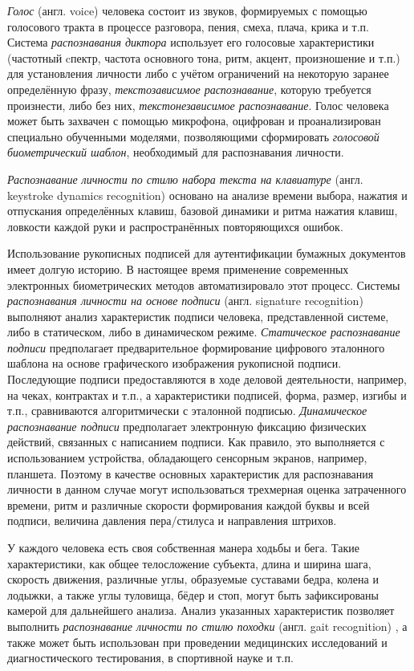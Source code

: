 \documentclass[12pt]{book}
\begin{document}
\large{\textit{Голос} (англ. voice) человека состоит из звуков, формируемых с помощью голосового тракта в процессе разговора, пения, смеха, плача, крика и т.п. Система \textit{распознавания диктора} \cite{unar_2014, minaee_2023, hansen_2015, bai_2021} использует его голосовые характеристики (частотный cпектр, частота основного тона, ритм, акцент, произношение и т.п.) для установления личности либо с учётом ограничений на некоторую заранее определённую фразу, \textit{текстозависимое распознавание}, которую требуется произнести, либо без них, \textit{текстонезависимое распознавание}. Голос человека может быть захвачен с помощью микрофона, оцифрован и проанализирован специально обученными моделями, позволяющими сформировать \textit{голосовой биометрический шаблон}, необходимый для распознавания личности. 

\textit{Распознавание личности по стилю набора текста на клавиатуре} (англ. keystroke dynamics recognition) \cite{unar_2014, sharma_2023} основано на анализе времени выбора, нажатия и отпускания определённых клавиш, базовой динамики и ритма нажатия клавиш, ловкости каждой руки и распространённых повторяющихся ошибок.

Использование рукописных подписей для аутентификации бумажных документов имеет долгую историю. В настоящее время применение современных электронных биометрических методов автоматизировало этот процесс. Системы \textit{распознавания личности на основе подписи} (англ. signature recognition) \cite{unar_2014, minaee_2023} выполняют анализ характеристик подписи человека, представленной системе, либо в статическом, либо в динамическом режиме. \textit{Статическое распознавание подписи} предполагает предварительное формирование цифрового эталонного шаблона на основе графического изображения рукописной подписи. Последующие подписи предоставляются в ходе деловой деятельности, например, на чеках, контрактах и т.п., а характеристики подписей, форма, размер, изгибы и т.п., сравниваются алгоритмически с эталонной подписью. \textit{Динамическое распознавание подписи} предполагает электронную фиксацию физических действий, связанных с написанием подписи. Как правило, это выполняется с использованием устройства, обладающего сенсорным экранов, например, планшета. Поэтому в качестве основных характеристик для распознавания личности в данном случае могут использоваться трехмерная оценка затраченного времени, ритм и различные скорости формирования каждой буквы и всей подписи, величина давления пера/стилуса и направления штрихов.

У каждого человека есть своя собственная манера ходьбы и бега. Такие характеристики, как общее телосложение субъекта, длина и ширина шага, скорость движения, различные углы, образуемые суставами бедра, колена и лодыжки, а также углы туловища, бёдер и стоп, могут быть зафиксированы камерой для дальнейшего анализа. Анализ  указанных характеристик позволяет выполнить \textit{распознавание личности по стилю походки} (англ. gait recognition) \cite{unar_2014, minaee_2023, shen_2022}, а также может быть использован при проведении медицинских исследований и диагностического тестирования, в спортивной науке и т.п.

}
\end{document}
